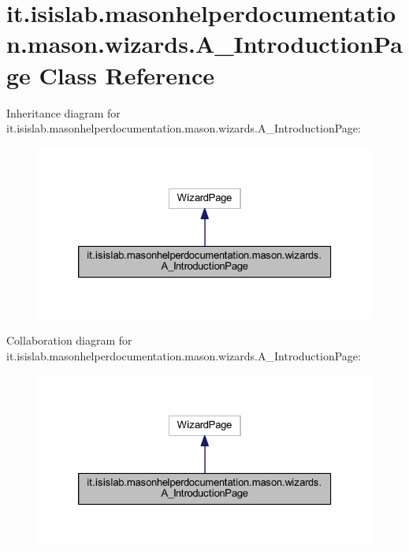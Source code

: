 \hypertarget{classit_1_1isislab_1_1masonhelperdocumentation_1_1mason_1_1wizards_1_1_a___introduction_page}{\section{it.\-isislab.\-masonhelperdocumentation.\-mason.\-wizards.\-A\-\_\-\-Introduction\-Page Class Reference}
\label{classit_1_1isislab_1_1masonhelperdocumentation_1_1mason_1_1wizards_1_1_a___introduction_page}
}


Inheritance diagram for it.\-isislab.\-masonhelperdocumentation.\-mason.\-wizards.\-A\-\_\-\-Introduction\-Page\-:\nopagebreak
\begin{figure}[H]
\begin{center}
\leavevmode
\includegraphics[width=326pt]{classit_1_1isislab_1_1masonhelperdocumentation_1_1mason_1_1wizards_1_1_a___introduction_page__inherit__graph}
\end{center}
\end{figure}


Collaboration diagram for it.\-isislab.\-masonhelperdocumentation.\-mason.\-wizards.\-A\-\_\-\-Introduction\-Page\-:\nopagebreak
\begin{figure}[H]
\begin{center}
\leavevmode
\includegraphics[width=326pt]{classit_1_1isislab_1_1masonhelperdocumentation_1_1mason_1_1wizards_1_1_a___introduction_page__coll__graph}
\end{center}
\end{figure}
